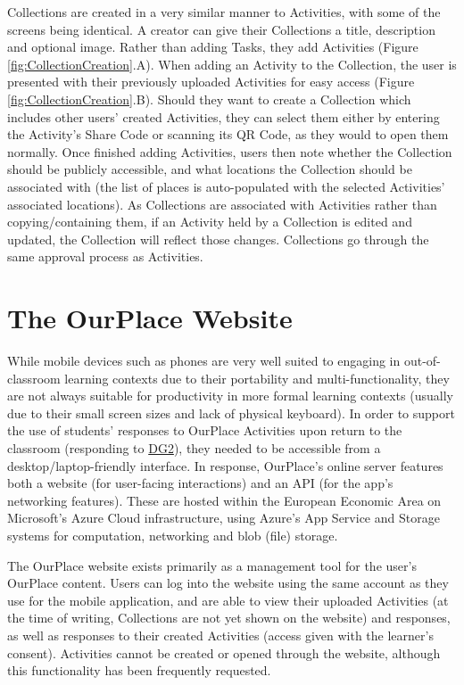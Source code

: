 Collections are created in a very similar manner to Activities, with some of the screens being identical. A creator can give their Collections a title, description and optional image. Rather than adding Tasks, they add Activities (Figure \ref{fig:CollectionCreation}.A). When adding an Activity to the Collection, the user is presented with their previously uploaded Activities for easy access (Figure \ref{fig:CollectionCreation}.B). Should they want to create a Collection which includes other users' created Activities, they can select them either by entering the Activity's Share Code or scanning its QR Code, as they would to open them normally. Once finished adding Activities, users then note whether the Collection should be publicly accessible, and what locations the Collection should be associated with (the list of places is auto-populated with the selected Activities' associated locations). As Collections are associated with Activities rather than copying/containing them, if an Activity held by a Collection is edited and updated, the Collection will reflect those changes. Collections go through the same approval process as Activities.

\section{The OurPlace Website}
\label{sec:ImplementationWeb}
While mobile devices such as phones are very well suited to engaging in out-of-classroom learning contexts due to their portability and multi-functionality, they are not always suitable for productivity in more formal learning contexts (usually due to their small screen sizes and lack of physical keyboard). In order to support the use of students' responses to OurPlace Activities upon return to the classroom (responding to \hyperref[DG2]{DG2}), they needed to be accessible from a desktop/laptop-friendly interface. In response, OurPlace's online server features both a website (for user-facing interactions) and an API (for the app's networking features). These are hosted within the European Economic Area on Microsoft's Azure Cloud infrastructure, using Azure's App Service and Storage systems for computation, networking and blob (file) storage.

The OurPlace website exists primarily as a management tool for the user's OurPlace content. Users can log into the website using the same account as they use for the mobile application, and are able to view their uploaded Activities (at the time of writing, Collections are not yet shown on the website) and responses, as well as responses to their created Activities (access given with the learner's consent). Activities cannot be created or opened through the website, although this functionality has been frequently requested. 

